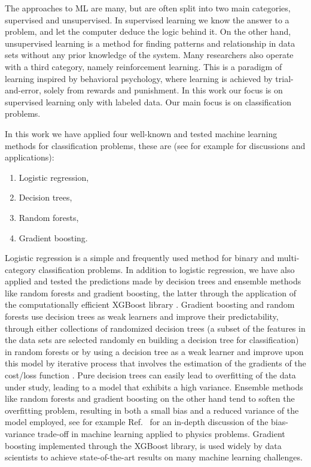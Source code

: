\documentclass[superscriptaddress,unsortedaddress,
 amsmath,amssymb,
 aps,
]{revtex4-2}
\begin{document}
The approaches to ML are many, but are often split into two main categories, supervised and unsupervised. In supervised learning we know the answer to a problem, and let the computer deduce the logic behind it. On the other hand, unsupervised learning is a method for finding patterns and relationship in data sets without any prior knowledge of the system. Many researchers also operate with a third category, namely reinforcement learning. This is a paradigm of learning inspired by behavioral psychology, where learning is achieved by trial-and-error, solely from rewards and punishment. In this work our focus is on supervised learning only with labeled data. Our main focus is on classification problems.

In this work we have applied four well-known and tested machine learning methods for classification problems, these are (see for example \cite{Hastie2009,Mehta2019} for discussions and applications):
\begin{enumerate}
    \item Logistic regression,
    \item Decision trees,
    \item Random forests,
    \item Gradient boosting.
\end{enumerate}
Logistic regression \cite{Hastie2009} is a simple and frequently used method for binary and multi-category classification problems.  In addition to logistic regression, we have also applied and tested the predictions made by decision trees and ensemble methods like random forests and gradient boosting, the latter through the application of the computationally efficient  XGBoost library \cite{xgboost2016}. Gradient boosting and random forests use decision trees as weak learners and improve their predictability, through either collections of randomized decision trees (a subset of the features in the data sets are selected randomly en building a decision tree for classification)  in random forests or by using a decision tree as a weak learner and improve upon this model by iterative process that involves the estimation of the gradients of the cost/loss function \cite{Hastie2009}. Pure decision trees can easily lead to overfitting of the data under
 study, leading to a model that exhibits a high variance. Ensemble methods like random forests and gradient boosting on the other hand tend to soften the overfitting problem, resulting in both a small bias and a reduced variance of the model employed, see for example Ref.~\cite{Mehta2019} for an in-depth discussion of the bias-variance trade-off in machine learning applied to physics problems. Gradient boosting implemented through the  XGBoost library, is used widely by data scientists to achieve state-of-the-art results on many machine learning challenges.
\end{document}
